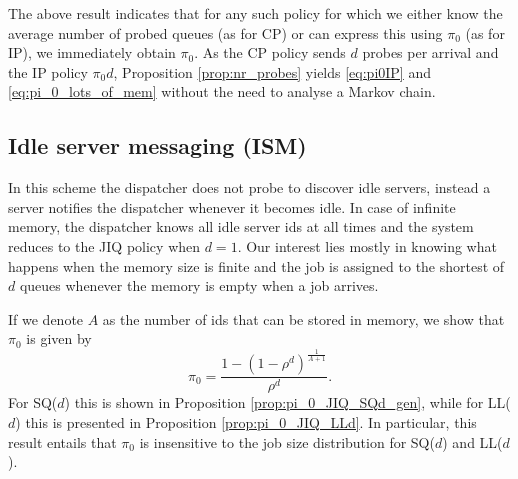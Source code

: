\documentclass[12pt]{report}
\newtheorem{remark}{Remark}
\begin{document}
The above result indicates that for any such policy for which we either know the 
average number of probed queues (as for CP) or can express this using $\pi_0$
(as for IP), we immediately obtain $\pi_0$. 
As the CP policy sends $d$ probes per arrival and the IP policy $\pi_0 d$,  
Proposition  \ref{prop:nr_probes} yields 
\eqref{eq:pi0IP} and \eqref{eq:pi_0_lots_of_mem} without the need to analyse a 
Markov chain.






\subsection{Idle server messaging (ISM)}\label{sec:example_JIQ}
In this scheme the dispatcher does not probe to discover idle servers, instead a server 
notifies the dispatcher whenever it becomes idle. In case of infinite memory, the dispatcher
knows all idle server ids at all times and the system reduces to the JIQ policy
when $d=1$. Our interest lies mostly in knowing what happens when the memory size is finite
and the job is assigned to the shortest of $d$ queues whenever the memory is empty
when a job arrives.

If we denote $A$ as the number of ids that can be stored in memory, we show that $\pi_0$ 
is given by
\begin{equation}\label{eq:pi_0_JIQ}
\pi_0
=
\frac{1-(1-\rho^d)^{\frac{1}{A+1}}}{\rho^d}.
\end{equation}
For SQ($d$) this is shown in Proposition \ref{prop:pi_0_JIQ_SQd_gen}, while for LL($d$) this is presented in Proposition \ref{prop:pi_0_JIQ_LLd}. In particular, this result entails that $\pi_0$ is insensitive to the job size distribution for SQ($d$) and LL($d$).
\end{document}
